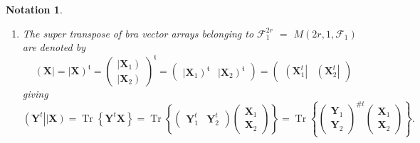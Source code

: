 \documentclass[aps, preprint]{revtex4}
\newtheorem{notation}[theorem]{Notation}
\begin{document}
\begin{notation}
\begin{enumerate}
\item The \emph{super} \emph{transpose}
of bra vector arrays belonging to $\mathcal{F}_{1}^{2 r}$ $ =$ $M \left (2 r ,1 ,\mathcal{F}_{1}\right )$ are denoted by
\begin{equation}\left (\mathbf{X}\right \vert  =\left \vert \mathbf{X}\right )^{\mathfrak{t}} =\left (\begin{array}{c}\left \vert \mathbf{X}_{1}\right ) \\
\left \vert \mathbf{X}_{2}\right )\end{array}\right )^{\mathfrak{t}} =\left (\begin{array}{cc}\left \vert \mathbf{X}_{1}\right )^{\mathfrak{t}} & \left \vert \mathbf{X}_{2}\right )^{\mathfrak{t}}\end{array}\right ) =\left (\begin{array}{cc}\left (\mathbf{X}_{1}^{t}\right \vert  & \left (\mathbf{X}_{2}^{t}\right \vert \end{array}\right )
\end{equation}giving
\begin{equation}\left (\mathbf{Y}^{t}\right \vert \left \vert \mathbf{X}\right ) =\ensuremath{\operatorname*{Tr}} \left \{\mathbf{Y}^{t} \mathbf{X}\right \} =\ensuremath{\operatorname*{Tr}} \left \{\left (\begin{array}{cc}\mathbf{Y}_{1}^{t} & \mathbf{Y}_{2}^{t}\end{array}\right ) \left (\begin{array}{c}\mathbf{X}_{1} \\
\mathbf{X}_{2}\end{array}\right )\right \} =\ensuremath{\operatorname*{Tr}} \left \{\left (\begin{array}{c}\mathbf{Y}_{1} \\
\mathbf{Y}_{2}\end{array}\right )^{\# t} \left (\begin{array}{c}\mathbf{X}_{1} \\
\mathbf{X}_{2}\end{array}\right )\right \}\text{.}
\end{equation}


\end{enumerate}
\end{notation}
\end{document}
